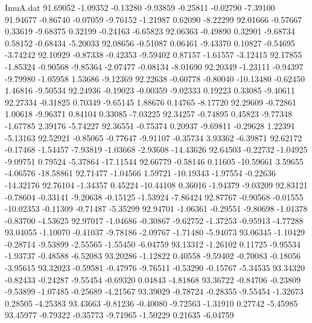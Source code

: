 \begin{filecontents}{ImuA.dat}
  91.69052   -1.09352   -0.13280   -9.93859   -0.25811   -0.02790   -7.39100
  91.94677   -0.86740   -0.07059   -9.76152   -1.21987    0.62090   -8.22299
  92.01666   -0.57667    0.33619   -9.68375    0.32199   -0.24163   -6.65823
  92.06363   -0.49890    0.32901   -9.68734    0.58152   -0.68434   -5.20033
  92.08656   -0.51087    0.06461   -9.43370    0.10827   -0.54695   -3.74242
  92.10929   -0.87338   -0.42353   -9.59402    0.87157   -1.61557   -3.12415
  92.17855   -1.85324   -0.90568   -9.85364   -2.07477   -0.08134   -8.01690
  92.20349   -1.23111   -0.94397   -9.79980   -1.05958    1.53686   -9.12369
  92.22638   -0.60778   -0.80040  -10.13480   -0.62450    1.46816   -9.50534
  92.24936   -0.19023   -0.00359   -9.02333    0.19223    0.33085   -9.40611
  92.27334   -0.31825    0.70349   -9.65145    1.88676    0.14765   -8.17720
  92.29609   -0.72861    1.00618   -9.96371    0.84104    0.33085   -7.03225
  92.34257   -0.74895    0.45823   -9.77348   -1.67785    2.39176   -5.74227
  92.36551   -0.75374    0.20937   -9.69811   -0.29628    1.22391   -5.13163
  92.52921   -0.85065   -0.77647   -9.91107   -0.35734    3.93362   -6.39871
  92.62172   -0.17468   -1.54457   -7.93819   -1.03668   -2.93608  -14.43626
  92.64503   -0.22732   -1.04925   -9.09751    0.79524   -5.37864  -17.11544
  92.66779   -0.58146    0.11605  -10.59661    3.59655   -4.06576  -18.58861
  92.71477   -1.04566    1.59721  -10.19343   -1.97554   -0.22636  -14.32176
  92.76104   -1.34357    0.45224  -10.44108    0.36016   -1.94379   -9.03209
  92.83121   -0.78604   -0.33141   -9.20638   -0.15125   -1.53924   -7.86424
  92.87767   -0.90568   -0.01555  -10.02353   -0.11309   -0.71487   -5.35299
  92.94701   -1.06361   -0.29551   -9.80698   -1.01378   -0.83700   -4.53625
  92.97017   -1.04686   -0.30867   -9.62752   -1.37253   -0.95913   -4.77288
  93.04055   -1.10070   -0.41037   -9.78186   -2.09767   -1.71480   -5.94073
  93.06345   -1.10429   -0.28714   -9.53899   -2.55565   -1.55450   -6.04759
  93.13312   -1.26102    0.11725   -9.95534   -1.93737   -0.48588   -6.52083
  93.20286   -1.12822    0.40558   -9.59402   -0.70083   -0.18056   -3.95615
  93.32023   -0.59581   -0.47976   -9.76511   -0.53290   -0.15767   -5.34535
  93.34320   -0.82433   -0.24287   -9.55454   -0.69320    0.04843   -4.81868
  93.36722   -0.84706   -0.23809   -9.53899   -1.07485   -0.25689   -4.21567
  93.39029   -0.78724   -0.28355   -9.55454   -1.32673    0.28505   -4.25383
  93.43663   -0.81236   -0.40080   -9.72563   -1.31910    0.27742   -5.45985
  93.45977   -0.79322   -0.35773   -9.71965   -1.50229    0.21635   -6.04759

\end{filecontents}
